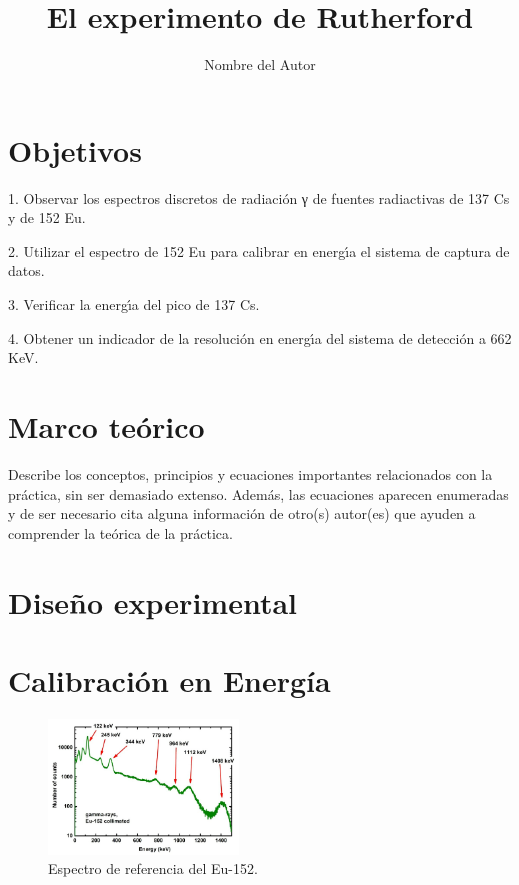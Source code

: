 \documentclass[twocolumn,a4paper,11pt]{scrartcl}
\title{El experimento de Rutherford}
\author{Nombre del Autor}
\date{}
\begin{document}

\section{Objetivos}
1. Observar los espectros discretos de radiación γ de fuentes radiactivas de 137 Cs y de 152 Eu.

2. Utilizar el espectro de 152 Eu para calibrar en energı́a el sistema de captura de datos.

3. Verificar la energı́a del pico de 137 Cs.

4. Obtener un indicador de la resolución en energı́a del sistema de detección a 662 KeV.

\section{Marco teórico}
Describe los conceptos, principios y ecuaciones importantes relacionados con la práctica, sin ser demasiado extenso. Además, las ecuaciones aparecen enumeradas y de ser necesario cita alguna información de otro(s) autor(es) que ayuden a comprender la teórica de la práctica.

\section{Diseño experimental}
\section{Calibración en Energía}

\begin{figure}[]
  \includegraphics[width=0.45\textwidth]{espectro_de_referencia.png}
  \caption{Espectro de referencia del Eu-152.}
  \label{fig:eu152_ref}
\end{figure}
\end{document}
